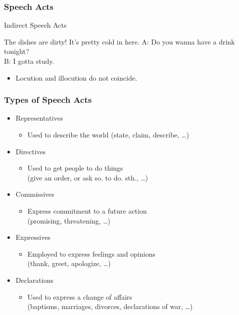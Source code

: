 \documentclass[12pt, table]{beamer}
\begin{document}
\begin{frame}
\frametitle{Speech Acts}
Indirect Speech Acts
\begin{exe}
\ex The dishes are dirty!
\ex It's pretty cold in here.
\ex A: Do you wanna have a drink tonight?\\ 
B: I gotta study.
\end{exe}
\begin{itemize}
\item Locution and illocution  do not coincide.
\end{itemize}
\end{frame}

\begin{frame}
\frametitle{Types of Speech Acts}
\begin{itemize}
\item Representatives 
\begin{itemize}
\item Used to describe the world (state, claim, describe,  \dots)
\end{itemize}
\item Directives 
\begin{itemize}
\item Used to get people to do things \\ (give an order, or ask so. to do. sth., \dots)
\end{itemize}
\item Commissives 
\begin{itemize}
\item Express commitment  to a future action \\ (promising, threatening, \dots)
\end{itemize}
\item Expressives 
\begin{itemize}
\item Employed to express feelings and opinions \\ (thank, greet, apologize, \dots)
\end{itemize}
\item Declarations 
\begin{itemize}
\item Used to express a change of affairs \\ (baptisms, marriages, divorces, declarations of war, \dots)
\end{itemize}
\end{itemize}
\end{frame}
\end{document}
